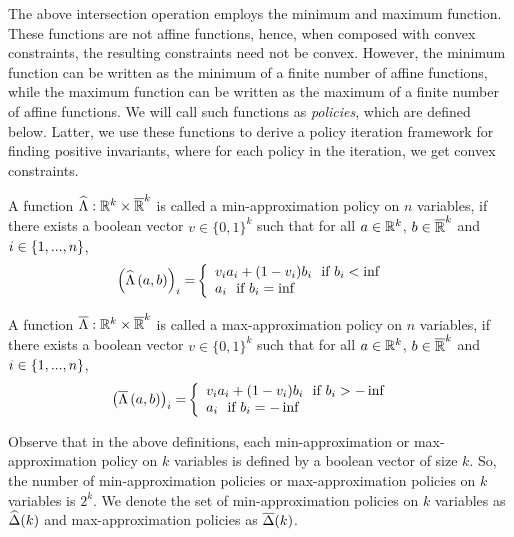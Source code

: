 The above intersection operation employs the minimum and maximum
function.  These functions are not affine functions, hence, when
composed with convex constraints, the resulting constraints need not
be convex.  However, the minimum function can be written as the
minimum of a finite number of affine functions, while the maximum
function can be written as the maximum of a finite number of affine
functions.  We will call such functions as \emph{policies}, which are
defined below.  Latter, we use these functions to derive a policy
iteration framework for finding positive invariants, where for each
policy in the iteration, we  get convex constraints.

\begin{definition} A function
  $\widehat{\Lambda}:\mathbb{R}^k\times\mathbb{\overline{R}}^k$ is called a
  min-approximation policy on $n$ variables, if there exists a boolean
  vector $v\in\{0,1\}^k$ such that for all $a\in\mathbb{R}^k$,
  $b\in\mathbb{\overline{R}}^k$ and $i\in\{1,...,n\}$,
\begin{align}
\left(\widehat{\Lambda}\left(a,b\right)\right)_i= & \left\{
\begin{array}{l}
v_ia_i+(1-v_i)b_i~~\text{if}~b_i<\inf\\
a_i~~\text{if}~b_i=\inf
\end{array}
\right.
\end{align}
\end{definition}
%


\begin{definition} A function
  $\overline{\Lambda}:\mathbb{R}^k\times\mathbb{\overline{R}}^k$ is called a
  max-approximation policy on $n$ variables, if there exists a boolean
  vector $v\in\{0,1\}^k$ such that for all $a\in\mathbb{R}^k$,
  $b\in\mathbb{\overline{R}}^k$ and $i\in\{1,...,n\}$,
\begin{align}
\left(\overline{\Lambda}\left(a,b\right)\right)_i= &\left\{
\begin{array}{l}
v_ia_i+(1-v_i)b_i~~\text{if}~b_i>-\inf\\
a_i~~\text{if}~b_i=-\inf
\end{array}
\right.
\end{align}
\end{definition}
%
Observe that in the above definitions, each min-approximation or
max-approximation policy on $k$ variables is defined by a boolean
vector of size $k$.  So, the number of min-approximation policies or
max-approximation policies on $k$ variables is $2^k$.  We denote the
set of min-approximation policies on $k$ variables as
$\widehat{\Delta}(k)$ and max-approximation policies as
$\overline{\Delta}(k)$.


